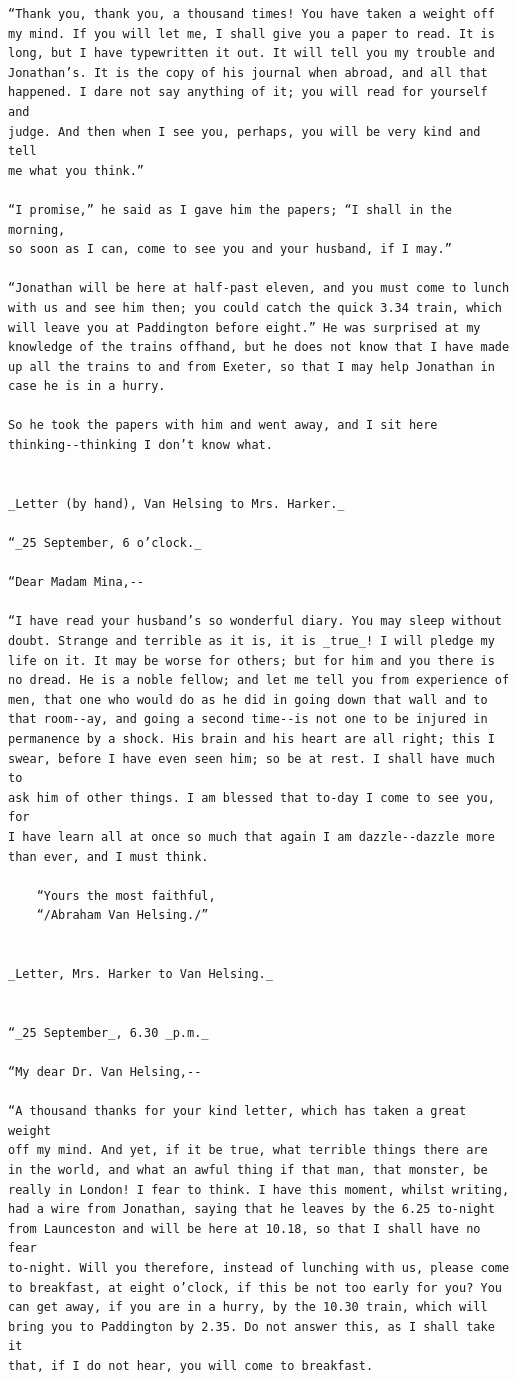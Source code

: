 \documentclass{article}
\begin{document}
\begin{verbatim}
“Thank you, thank you, a thousand times! You have taken a weight off
my mind. If you will let me, I shall give you a paper to read. It is
long, but I have typewritten it out. It will tell you my trouble and
Jonathan’s. It is the copy of his journal when abroad, and all that
happened. I dare not say anything of it; you will read for yourself and
judge. And then when I see you, perhaps, you will be very kind and tell
me what you think.”

“I promise,” he said as I gave him the papers; “I shall in the morning,
so soon as I can, come to see you and your husband, if I may.”

“Jonathan will be here at half-past eleven, and you must come to lunch
with us and see him then; you could catch the quick 3.34 train, which
will leave you at Paddington before eight.” He was surprised at my
knowledge of the trains offhand, but he does not know that I have made
up all the trains to and from Exeter, so that I may help Jonathan in
case he is in a hurry.

So he took the papers with him and went away, and I sit here
thinking--thinking I don’t know what.


_Letter (by hand), Van Helsing to Mrs. Harker._

“_25 September, 6 o’clock._

“Dear Madam Mina,--

“I have read your husband’s so wonderful diary. You may sleep without
doubt. Strange and terrible as it is, it is _true_! I will pledge my
life on it. It may be worse for others; but for him and you there is
no dread. He is a noble fellow; and let me tell you from experience of
men, that one who would do as he did in going down that wall and to
that room--ay, and going a second time--is not one to be injured in
permanence by a shock. His brain and his heart are all right; this I
swear, before I have even seen him; so be at rest. I shall have much to
ask him of other things. I am blessed that to-day I come to see you, for
I have learn all at once so much that again I am dazzle--dazzle more
than ever, and I must think.

    “Yours the most faithful,
    “/Abraham Van Helsing./”


_Letter, Mrs. Harker to Van Helsing._


“_25 September_, 6.30 _p.m._

“My dear Dr. Van Helsing,--

“A thousand thanks for your kind letter, which has taken a great weight
off my mind. And yet, if it be true, what terrible things there are
in the world, and what an awful thing if that man, that monster, be
really in London! I fear to think. I have this moment, whilst writing,
had a wire from Jonathan, saying that he leaves by the 6.25 to-night
from Launceston and will be here at 10.18, so that I shall have no fear
to-night. Will you therefore, instead of lunching with us, please come
to breakfast, at eight o’clock, if this be not too early for you? You
can get away, if you are in a hurry, by the 10.30 train, which will
bring you to Paddington by 2.35. Do not answer this, as I shall take it
that, if I do not hear, you will come to breakfast.


\end{verbatim}
\end{document}
